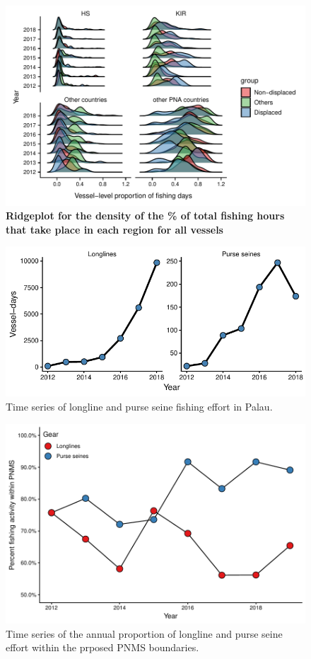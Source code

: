 \documentclass[12pt]{article}
\begin{document}
\begin{figure}
\centering
	\includegraphics{img/yearly_distribution_prop_fishing_by_region.pdf}
	\caption{\label{fig:yearly_distribution_prop_fishing_by_region}\textbf{Ridgeplot for the density of the \% of total fishing hours that take place in each region for all vessels}}	
\end{figure}

\begin{figure}
\centering
\includegraphics{img/PLW_GFW_ts.pdf}
\caption{\label{fig:PLW_GFW_ts}Time series of longline and purse seine fishing effort in Palau.}
\end{figure}

\begin{figure}
\centering
\includegraphics{img/plw_ts_plot.pdf}
\caption{\label{fig:plw_ts_plot}Time series of the annual proportion of longline and purse seine effort within the prposed PNMS boundaries.}
\end{figure}
\end{document}
